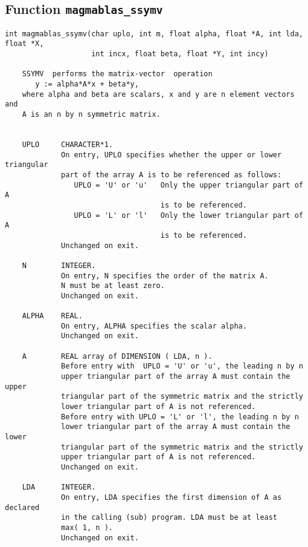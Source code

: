 \documentclass[10pt]{book}
\begin{document}
\vspace{0.2in}
\subsection{Function {\tt {\bf magmablas\_ssymv}}}
\begin{verbatim}
int magmablas_ssymv(char uplo, int m, float alpha, float *A, int lda, float *X, 
                    int incx, float beta, float *Y, int incy)

    SSYMV  performs the matrix-vector  operation
       y := alpha*A*x + beta*y,
    where alpha and beta are scalars, x and y are n element vectors and
    A is an n by n symmetric matrix.

 
    UPLO     CHARACTER*1.
             On entry, UPLO specifies whether the upper or lower triangular 
             part of the array A is to be referenced as follows:
                UPLO = 'U' or 'u'   Only the upper triangular part of A
                                    is to be referenced.
                UPLO = 'L' or 'l'   Only the lower triangular part of A
                                    is to be referenced.
             Unchanged on exit.

    N        INTEGER.
             On entry, N specifies the order of the matrix A.
             N must be at least zero.
             Unchanged on exit.

    ALPHA    REAL.
             On entry, ALPHA specifies the scalar alpha.
             Unchanged on exit.

    A        REAL array of DIMENSION ( LDA, n ).
             Before entry with  UPLO = 'U' or 'u', the leading n by n
             upper triangular part of the array A must contain the upper
             triangular part of the symmetric matrix and the strictly
             lower triangular part of A is not referenced.
             Before entry with UPLO = 'L' or 'l', the leading n by n
             lower triangular part of the array A must contain the lower
             triangular part of the symmetric matrix and the strictly
             upper triangular part of A is not referenced.
             Unchanged on exit.

    LDA      INTEGER.
             On entry, LDA specifies the first dimension of A as declared
             in the calling (sub) program. LDA must be at least
             max( 1, n ).
             Unchanged on exit.


\end{verbatim}
\end{document}
